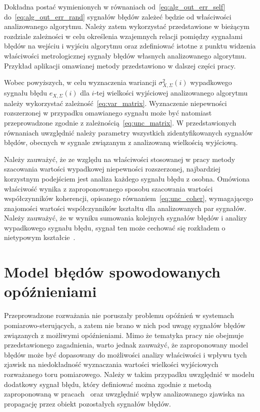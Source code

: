 Dokładna postać wymienionych w równaniach od~\eqref{eq:alg_out_err_self} do~\eqref{eq:alg_out_err_rand} sygnałów błędów zależeć będzie od właściwości analizowanego algorytmu. Należy zatem wykorzystać przedstawione w bieżącym rozdziale zależności w celu określenia wzajemnych relacji pomiędzy sygnałami błędów na wejściu i wyjściu algorytmu oraz zdefiniować istotne z punktu widzenia właściwości metrologicznej sygnały błędów własnych analizowanego algorytmu. Przykład aplikacji omawianej metody przedstawiono w dalszej części pracy.

Wobec powyższych, w celu wyznaczenia wariancji $\sigma_{X,\Sigma}^{2}(i)$ wypadkowego sygnału błędu $e_{X,\Sigma}(i)$ dla $i$-tej wielkości wyjściowej analizowanego algorytmu należy wykorzystać zależność~\eqref{eq:var_matrix}. Wyznaczenie niepewności rozszerzonej w przypadku omawianego sygnału może być natomiast przeprowadzone zgodnie z zależnością~\eqref{eq:unc_matrix}. W przedstawionych równaniach uwzględnić należy parametry wszystkich zidentyfikowanych sygnałów błędów, obecnych w sygnale związanym z analizowaną wielkością wyjściową.

Należy zauważyć, że ze względu na właściwości stosowanej w pracy metody szacowania wartości wypadkowej niepewności rozszerzonej, najbardziej korzystnym podejściem jest analiza każdego sygnału błędu z osobna. Omówiona właściwość wynika z zaproponowanego sposobu szacowania wartości współczynników koherencji, opisanego równaniem~\eqref{eq:unc_coher}, wymagającego znajomości wartości współczynników kształtu dla analizowanych par sygnałów. Należy zauważyć, że w wyniku sumowania kolejnych sygnałów błędów i analizy wypadkowego sygnału błędu, sygnał ten może cechować się rozkładem o nietypowym kształcie~\cite{auth_random, auth_model, zhang_pdp}.

\section{Model błędów spowodowanych opóźnieniami}

Przeprowadzone rozważania nie poruszały problemu opóźnień w systemach pomiarowo-sterujących, a zatem nie brano w nich pod uwagę sygnałów błędów związanych z możliwymi opóźnieniami. Mimo że tematyka pracy nie obejmuje przedstawionego zagadnienia, warto jednak zauważyć, że zaproponowany model błędów może być dopasowany do możliwości analizy właściwości i wpływu tych zjawisk na niedokładność wyznaczania wartości wielkości wyjściowych rozważanego toru pomiarowego. Należy w takim przypadku uwzględnić w modelu dodatkowy sygnał błędu, który definiować można zgodnie z metodą zaproponowaną w pracach~\cite{wymyslo_delay, jakubiec_system} oraz uwzględnić wpływ analizowanego zjawiska na propagację przez obiekt pozostałych sygnałów błędów.

